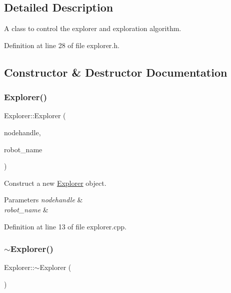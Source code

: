 \subsection{Detailed Description}
A class to control the explorer and exploration algorithm. 

Definition at line 28 of file explorer.\+h.



\subsection{Constructor \& Destructor Documentation}
\mbox{\label{class_explorer_aafe6b7c3b9c2e24815aa14a731f31890}} 
\subsubsection{\texorpdfstring{Explorer()}{Explorer()}}
{\footnotesize\ttfamily Explorer\+::\+Explorer (\begin{DoxyParamCaption}\item[{ros\+::\+Node\+Handle $\ast$}]{nodehandle,  }\item[{const std\+::string \&}]{robot\+\_\+name }\end{DoxyParamCaption})}



Construct a new \hyperlink{class_explorer}{Explorer} object. 


\begin{DoxyParams}{Parameters}
{\em nodehandle} & \\
\hline
{\em robot\+\_\+name} & \\
\hline
\end{DoxyParams}


Definition at line 13 of file explorer.\+cpp.

\mbox{\label{class_explorer_aa1b0a71e92e003e9162a5ba99d843392}} 
\subsubsection{\texorpdfstring{$\sim$\+Explorer()}{~Explorer()}}
{\footnotesize\ttfamily Explorer\+::$\sim$\+Explorer (\begin{DoxyParamCaption}{ }\end{DoxyParamCaption})\hspace{0.3cm}{\ttfamily [inline]}}



